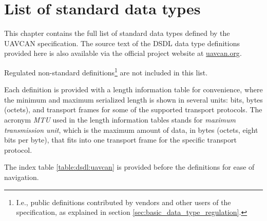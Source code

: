 \chapter{List of standard data types}\label{sec:sdt}

This chapter contains the full list of standard data types defined by the UAVCAN specification.
The source text of the DSDL data type definitions provided here is also available via the
official project website at \href{http://uavcan.org}{uavcan.org}.

Regulated non-standard definitions\footnote{I.e., public definitions contributed by vendors and other users
of the specification, as explained in section \ref{sec:basic_data_type_regulation}.}
are not included in this list.

Each definition is provided with a length information table for convenience,
where the minimum and maximum serialized length is shown in several units:
bits, bytes (octets), and transport frames for some of the supported transport protocols.
The acronym \emph{MTU} used in the length information tables stands for
\emph{maximum transmission unit}, which is the maximum amount of data, in bytes (octets, eight bits per byte),
that fits into one transport frame for the specific transport protocol.

The index table \ref{table:dsdl:uavcan} is provided before the definitions for ease of navigation.

\clearpage{}
